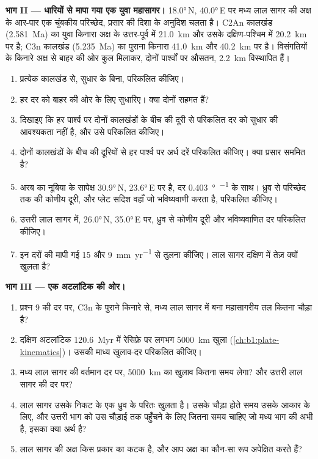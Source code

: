 \begin{problem}
\medskip
\noindent\textbf{भाग II --- धारियों से मापा गया एक युवा महासागर।} \ang{18.0}\,N, \ang{40.0}\,E पर मध्य लाल सागर की अक्ष के आर-पार एक चुंबकीय परिच्छेद, प्रसार की दिशा के अनुदिश चलता है। C2An कालखंड (\qty{2.581}{Ma}) का युवा किनारा अक्ष के उत्तर-पूर्व में \qty{21.0}{km} और उसके दक्षिण-पश्चिम में \qty{20.2}{km} पर है; C3n कालखंड (\qty{5.235}{Ma}) का पुराना किनारा \qty{41.0}{km} और \qty{40.2}{km} पर है। विसंगतियों के किनारे अक्ष से बाहर की ओर कुल मिलाकर, दोनों पार्श्वों पर औसतन, \qty{2.2}{km} विस्थापित हैं।
\begin{enumerate}[resume]
  \item प्रत्येक कालखंड से, सुधार के बिना,  परिकलित कीजिए।
  \item हर दर को बाहर की ओर  के लिए सुधारिए। क्या दोनों सहमत हैं?
  \item दिखाइए कि हर पार्श्व पर दोनों कालखंडों के बीच की दूरी से परिकलित दर को सुधार की आवश्यकता नहीं है, और उसे परिकलित कीजिए।
  \item दोनों कालखंडों के बीच की दूरियों से हर पार्श्व पर अर्ध दरें परिकलित कीजिए। क्या प्रसार सममित है?
  \item अरब का नूबिया के सापेक्ष  \ang{30.9}\,N, \ang{23.6}\,E पर है, दर \qty{0.403}{\degree\per\Myr} के साथ। ध्रुव से परिच्छेद तक की कोणीय दूरी, और प्लेट सदिश वहाँ जो  भविष्यवाणी करता है, परिकलित कीजिए।
  \item उत्तरी लाल सागर में, \ang{26.0}\,N, \ang{35.0}\,E पर, ध्रुव से कोणीय दूरी और भविष्यवाणित दर परिकलित कीजिए।
  \item इन दरों की मापी गई 15 और \qty{9}{mm.yr^{-1}} से तुलना कीजिए। लाल सागर दक्षिण में तेज़ क्यों खुलता है?
\end{enumerate}

\medskip
\noindent\textbf{भाग III --- एक अटलांटिक की ओर।}
\begin{enumerate}[resume]
  \item प्रश्न 9 की दर पर, C3n के पुराने किनारे से, मध्य लाल सागर में बना महासागरीय तल कितना चौड़ा है?
  \item दक्षिण अटलांटिक \qty{120.6}{Myr} में रेसिफ़े पर लगभग \qty{5000}{km} खुला (\cref{ch:b1:plate-kinematics})। उसकी माध्य खुलाव-दर परिकलित कीजिए।
  \item मध्य लाल सागर की वर्तमान दर पर, \qty{5000}{km} का खुलाव कितना समय लेगा? और उत्तरी लाल सागर की दर पर?
  \item लाल सागर उसके निकट के एक ध्रुव के परितः खुलता है। उसके चौड़ा होते समय उसके आकार के लिए, और उत्तरी भाग को उस चौड़ाई तक पहुँचने के लिए जितना समय चाहिए जो मध्य भाग की अभी है, इसका क्या अर्थ है?
  \item लाल सागर की अक्ष किस प्रकार का कटक है, और आप अक्ष का कौन-सा रूप अपेक्षित करते हैं?
\end{enumerate}


\end{problem}
